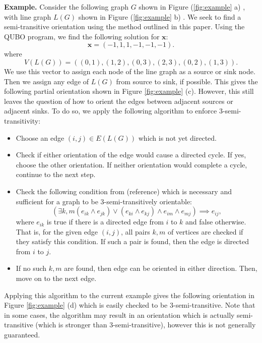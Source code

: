 \documentclass{article}
\newcommand{\mb}[1]{\boldsymbol{#1}}
\begin{document}
\iffalse
\textbf{Example.}
Consider the following graph $G$ shown in Figure (\ref{fig:example} a) , with line graph $L(G)$ shown in Figure (\ref{fig:example} b) . We seek to find a semi-transitive orientation using the method outlined in this paper. Using the QUBO program, we find the following solution for $\mb{x}$:
\begin{equation}
    \mb{x}=(-1,1,1,-1,-1,-1).
\end{equation}
where
\begin{equation}
    V(L(G))=\left((0, 1), (1, 2), (0, 3), (2, 3), (0, 2), (1, 3)\right).
\end{equation}
We use this vector to assign each node of the line graph as a source or sink node. Then we assign any edge of $L(G)$ from source to sink, if possible. This gives the following partial orientation shown in Figure \ref{fig:example} (c). However, this still leaves the question of how to orient the edges between adjacent sources or adjacent sinks. To do so, we apply the following algorithm to enforce 3-semi-transitivity:
\begin{itemize}
    \item Choose an edge $(i,j)\in E(L(G))$ which is not yet directed.
    \item Check if either orientation of the edge would cause a directed cycle. If yes, choose the other orientation. If neither orientation would complete a cycle, continue to the next step.
    \item Check the following condition from (reference) which is necessary and sufficient for a graph to be 3-semi-transitively orientable:
    \begin{equation}
        \left(\exists k,m (e_{ik}\land e_{jk})\lor(e_{ki}\land e_{kj})\land e_{im} \land e_{mj} \right)\implies e_{ij},
    \end{equation}
    where $e_{ik}$ is true if there is a directed edge from $i$ to $k$ and false otherwise. That is, for the given edge $(i,j)$, all pairs $k,m$ of vertices are checked if they satisfy this condition. If such a pair is found, then the edge is directed from $i$ to $j$.
    \item If no such $k,m$ are found, then edge can be oriented in either direction. Then, move on to the next edge.
\end{itemize}
Applying this algorithm to the current example gives the following orientation in Figure \ref{fig:example} (d) which is easily checked to be 3-semi-transitive. Note that in some cases, the algorithm may result in an orientation which is actually semi-transitive (which is stronger than 3-semi-transitive), however this is not generally guaranteed.
\end{document}
